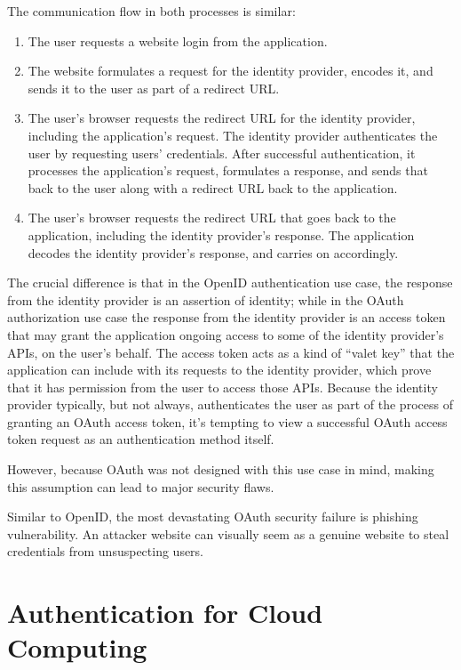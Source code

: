 \begin{multicols}{2}
The communication flow in both processes is similar:


\begin{enumerate}
\item The user requests a website login from the application.
\item The website formulates a request for the identity provider, encodes it, and sends it to the user as part of a redirect URL.
\item The user's browser requests the redirect URL for the identity provider, including the application's request. The identity provider authenticates the user by requesting users' credentials. After successful authentication, it processes the application's request, formulates a response, and sends that back to the user along with a redirect URL back to the application.
\item The user's browser requests the redirect URL that goes back to the application, including the identity provider's response. The application decodes the identity provider's response, and carries on accordingly. 
\end{enumerate}

The crucial difference is that in the OpenID authentication use case, the response from the identity provider is an assertion of identity; while in the OAuth authorization use case the response from the identity provider is an access token that may grant the application ongoing access to some of the identity provider's APIs, on the user's behalf. The access token acts as a kind of ``valet key'' that the application can include with its requests to the identity provider, which prove that it has permission from the user to access those APIs. Because the identity provider typically, but not always, authenticates the user as part of the process of granting an OAuth access token, it's tempting to view a successful OAuth access token request as an authentication method itself.

However, because OAuth was not designed with this use case in mind, making this assumption can lead to major security flaws.

Similar to OpenID, the most devastating OAuth security failure is phishing vulnerability. An attacker website can visually seem as a genuine website to steal credentials from unsuspecting users.

\section*{Authentication for Cloud Computing}


\end{multicols}
